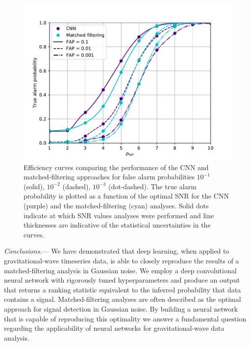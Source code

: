 \documentclass[%
showpacs,
 amsmath,amssymb,
 aps,
 twocolumn,
 prl,
 reprint,
floatfix,
]{revtex4-1}
\begin{document}
%
%
\begin{figure}[]
\includegraphics[width=\columnwidth] {figures/efficiency.pdf}
\caption{Efficiency curves comparing the performance of the \ac{CNN} and
matched-filtering approaches for false alarm probabilities $10^{-1}$ (solid),
$10^{-2}$ (dashed), $10^{-3}$ (dot-dashed). The true alarm probability is
plotted as a function of the optimal \ac{SNR} for the \ac{CNN} (purple) and the
matched-filtering (cyan) analyses. Solid dots indicate at which \ac{SNR} values
analyses were performed and line thicknesses are indicative of the
statistical uncertainties in the curves.\label{fig:efficiency_curve}} 
\end{figure}

%
%
\textit{Conclusions.}--- 
%
%
We have demonstrated that deep learning, when applied to
gravitational-wave timeseries data, is able to closely reproduce the
results of a matched-filtering analysis in Gaussian noise. We employ a deep
convolutional neural network with rigorously tuned hyperparameters and produce
an output that returns a ranking statistic equivalent to the inferred
probability that data contains a signal. Matched-filtering analyses are often
described as the optimal approach for signal detection in Gaussian noise. By
building a neural network that is capable of reproducing this
optimality we answer a fundamental question regarding the applicability of
neural networks for gravitational-wave data analysis. 
\end{document}
